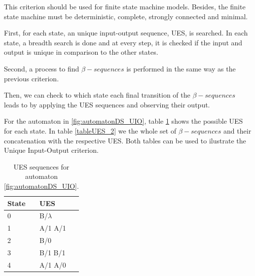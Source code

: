 \begin{itemize}
This criterion should be used for finite state machine models. Besides, the finite state machine must be deterministic, complete, strongly connected and minimal. 

First, for each state, an unique input-output sequence, UES, is searched. In each state, a breadth search is done and at every step, it is checked if the input and output is unique in comparison to the other states.

Second, a process to find $\beta-sequences$ is performed in the same way as the previous criterion.

Then, we can check to which state each final transition of the $\beta-sequences$ leads to by applying the UES sequences and observing their output.

For the automaton in \ref{fig:automatonDS_UIO}, table \ref{tableUES_1} shows the possible UES for each state. In table \ref{tableUES_2} we the whole set of $\beta-sequences$ and their concatenation with the respective UES. Both tables can be used to ilustrate the Unique Input-Output criterion.

\end{itemize}

\begin{table}
\begin{center}
\begin{tabular}{| l | l|}

\hline

State & UES \\ \hline

0 & B/$\lambda$\\ \hline
1 & A/1 A/1\\ \hline
2 & B/0\\ \hline
3 & B/1 B/1\\ \hline
4 & A/1 A/0\\

\hline
\end{tabular}
\end{center}
\caption{UES sequences for automaton \ref{fig:automatonDS_UIO}.\cite{inpe10}}
\label{tableUES_1}
\end{table}

